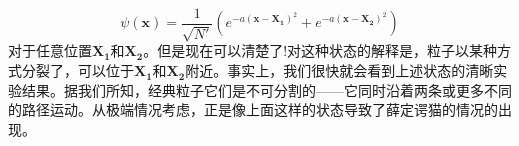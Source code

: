 \[
    \psi(\mathbf{x})=\dfrac{1}{\sqrt{N'}}(e^{-a(\mathbf{x}-\mathbf{X_1})^2}+e^{-a(\mathbf{x}-\mathbf{X_2})^2})
\]
对于任意位置$\mathbf{X_1}$和$\mathbf{X_2}$。但是现在可以清楚了!对这种状态的解释是，粒子以某种方式分裂了，可以位于$\mathbf{X_1}$和$\mathbf{X_2}$附近。事实上，我们很快就会看到上述状态的清晰实验结果。据我们所知，经典粒子它们是不可分割的——它同时沿着两条或更多不同的路径运动。从极端情况考虑，正是像上面这样的状态导致了薛定谔猫的情况的出现。

